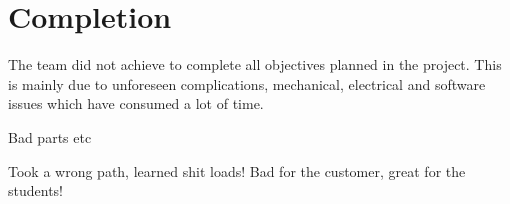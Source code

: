 \section{Completion}

The team did not achieve to complete all objectives planned in the project. This is mainly due to unforeseen complications, mechanical, electrical and software issues which have consumed a lot of time.

Bad parts etc


Took a wrong path, learned shit loads! Bad for the customer, great for the students!
